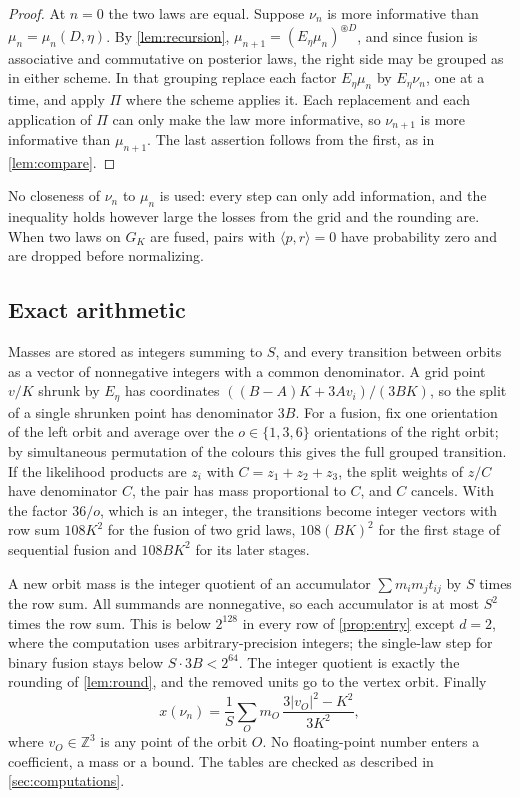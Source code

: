 \documentclass[11pt]{amsart}
\theoremstyle{definition}
\theoremstyle{remark}
\begin{document}
\begin{proof}
At $n=0$ the two laws are equal. Suppose $\nu_n$ is more informative than $\mu_n=\mu_n(D,\eta)$. By
\cref{lem:recursion}, $\mu_{n+1}=(E_\eta\mu_n)^{\circledast D}$, and since fusion is associative and
commutative on posterior laws, the right side may be grouped as in either scheme. In that grouping replace each
factor $E_\eta\mu_n$ by $E_\eta\nu_n$, one at a time, and apply $\Pi$ where the scheme applies it. Each
replacement and each application of $\Pi$ can only make the law more informative, so $\nu_{n+1}$ is more
informative than $\mu_{n+1}$. The last assertion follows from the first, as in \cref{lem:compare}.
\end{proof}

No closeness of $\nu_n$ to $\mu_n$ is used: every step can only add information, and the inequality holds however
large the losses from the grid and the rounding are. When two laws on $G_K$ are fused, pairs with
$\langle p,r\rangle=0$ have probability zero and are dropped before normalizing.

\subsection{Exact arithmetic}
Masses are stored as integers summing to $S$, and every transition between orbits as a vector of nonnegative
integers with a common denominator. A grid point $v/K$ shrunk by $E_\eta$ has coordinates
$((B-A)K+3Av_i)/(3BK)$, so the split of a single shrunken point has denominator $3B$. For a fusion, fix one
orientation of the left orbit and average over the $o\in\{1,3,6\}$ orientations of the right orbit; by
simultaneous permutation of the colours this gives the full grouped transition. If the likelihood products
are $z_i$ with $C=z_1+z_2+z_3$, the split weights of $z/C$ have denominator $C$, the pair has mass proportional
to $C$, and $C$ cancels. With the factor $36/o$, which is an integer, the transitions become integer vectors with
row sum $108K^2$ for the fusion of two grid laws, $108(BK)^2$ for the first stage of sequential fusion and
$108BK^2$ for its later stages.

A new orbit mass is the integer quotient of an accumulator $\sum m_im_jt_{ij}$ by $S$ times the row sum. All
summands are nonnegative, so each accumulator is at most $S^2$ times the row sum. This is below $2^{128}$ in
every row of \cref{prop:entry} except $d=2$, where the computation uses arbitrary-precision integers; the
single-law step for binary fusion stays below $S\cdot3B<2^{64}$. The integer quotient is exactly the rounding of
\cref{lem:round}, and the removed units go to the vertex orbit. Finally
\[
x(\nu_n)=\frac1S\sum_{O}m_O\,\frac{3|v_O|^2-K^2}{3K^2},
\]
where $v_O\in\mathbb Z^3$ is any point of the orbit $O$. No floating-point number enters a coefficient, a mass
or a bound. The tables are checked as described in \cref{sec:computations}.
\end{document}
